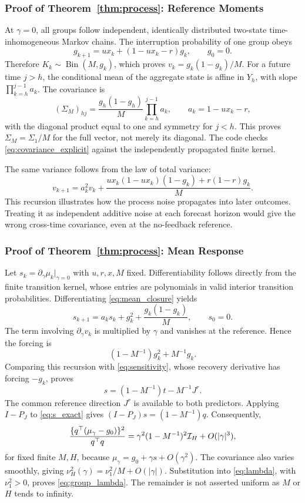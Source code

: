 \subsubsection{Proof of Theorem~\ref{thm:process}: Reference Moments}
At $\gamma=0$, all groups follow independent, identically distributed two-state time-inhomogeneous Markov chains. The interruption probability of one group obeys
\[
 g_{k+1}=ux_k+(1-ux_k-r)g_k,\qquad g_0=0.
\]
Therefore $K_k\sim\operatorname{Bin}(M,g_k)$, which proves $v_k=g_k(1-g_k)/M$. For a future time $j>h$, the conditional mean of the aggregate state is affine in $Y_h$, with slope $\prod_{k=h}^{j-1}a_k$. The covariance is
\begin{equation}
 (\Sigma_M)_{hj}
 =\frac{g_h(1-g_h)}{M}\prod_{k=h}^{j-1}a_k,
 \qquad a_k=1-ux_k-r,
 \label{eq:covariance_explicit}
\end{equation}
with the diagonal product equal to one and symmetry for $j<h$. This proves $\Sigma_M=\Sigma_1/M$ for the full vector, not merely its diagonal. The code checks \eqref{eq:covariance_explicit} against the independently propagated finite kernel.

The same variance follows from the law of total variance:
\[
 v_{k+1}=a_k^2v_k+
 \frac{ux_k(1-ux_k)(1-g_k)+r(1-r)g_k}{M}.
\]
This recursion illustrates how the process noise propagates into later outcomes. Treating it as independent additive noise at each forecast horizon would give the wrong cross-time covariance, even at the no-feedback reference.

\subsubsection{Proof of Theorem~\ref{thm:process}: Mean Response}
Let $s_k=\partial_\gamma\mu_k|_{\gamma=0}$ with $u,r,x,M$ fixed. Differentiability follows directly from the finite transition kernel, whose entries are polynomials in valid interior transition probabilities. Differentiating \eqref{eq:mean_closure} yields
\[
 s_{k+1}=a_ks_k+g_k^2+\frac{g_k(1-g_k)}{M},\qquad s_0=0.
\]
The term involving $\partial_\gamma v_k$ is multiplied by $\gamma$ and vanishes at the reference. Hence the forcing is
\[
 (1-M^{-1})g_k^2+M^{-1}g_k.
\]
Comparing this recursion with \eqref{eq:sensitivity}, whose recovery derivative has forcing $-g_k$, proves
\begin{equation}
 s=(1-M^{-1})t-M^{-1}J^r.
 \label{eq:s_exact}
\end{equation}
The common reference direction $J^r$ is available to both predictors. Applying $I-P_J$ to \eqref{eq:s_exact} gives $(I-P_J)s=(1-M^{-1})q$. Consequently,
\begin{equation}
 \frac{\{q^\top(\mu_\gamma-g_0)\}^2}{q^\top q}
 =\gamma^2(1-M^{-1})^2\mathcal I_H+O(|\gamma|^3),
 \label{eq:signal_expansion}
\end{equation}
for fixed finite $M,H$, because $\mu_\gamma=g_0+\gamma s+O(\gamma^2)$. The covariance also varies smoothly, giving
$\nu_H^2(\gamma)=\nu_1^2/M+O(|\gamma|)$.
Substitution into \eqref{eq:lambda}, with $\nu_1^2>0$, proves \eqref{eq:group_lambda}. The remainder is not asserted uniform as $M$ or $H$ tends to infinity.

